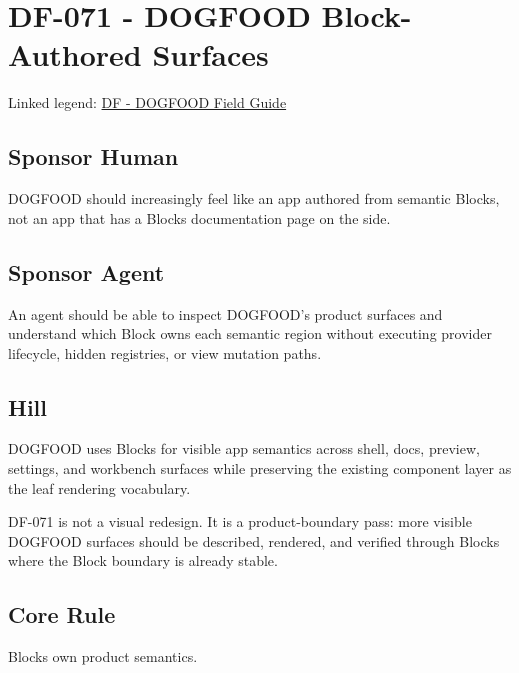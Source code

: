 \chapter{DF-071 - DOGFOOD Block-Authored Surfaces}\label{record-111}

\smallskip

Linked legend: \href{https://github.com/flyingrobots/bijou/blob/1853ad902f6bf219326409e7f743a5a1d6517dbc/docs/legends/DF-dogfood-field-guide.md}{DF - DOGFOOD Field Guide}

\section{Sponsor Human}\label{record-111-sponsor-human}

DOGFOOD should increasingly feel like an app authored from semantic Blocks, not an app that has a Blocks documentation page on the side.

\section{Sponsor Agent}\label{record-111-sponsor-agent}

An agent should be able to inspect DOGFOOD's product surfaces and understand which Block owns each semantic region without executing provider lifecycle, hidden registries, or view mutation paths.

\section{Hill}\label{record-111-hill}

DOGFOOD uses Blocks for visible app semantics across shell, docs, preview, settings, and workbench surfaces while preserving the existing component layer as the leaf rendering vocabulary.

DF-071 is not a visual redesign. It is a product-boundary pass: more visible DOGFOOD surfaces should be described, rendered, and verified through Blocks where the Block boundary is already stable.

\section{Core Rule}\label{record-111-core-rule}

Blocks own product semantics.


